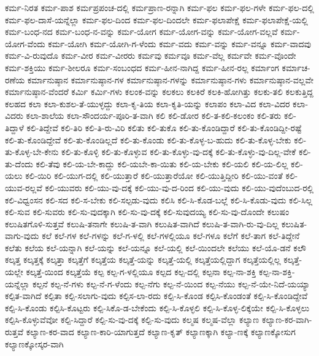 ಕರ್ಮ-ನಿರತ
ಕರ್ಮ-ಪಾಶ
ಕರ್ಮಪ್ರಪಂಚ-ದಲ್ಲಿ
ಕರ್ಮಪ್ರಾಣ-ರನ್ನಾಗಿ
ಕರ್ಮ-ಫಲ
ಕರ್ಮ-ಫಲ-ಗಳೇ
ಕರ್ಮ-ಫಲ-ದಲ್ಲಿ
ಕರ್ಮ-ಫಲ-ದಾಸೆ-ಯನ್ನೆಲ್ಲಾ
ಕರ್ಮ-ಫಲ-ದಿಂದ
ಕರ್ಮ-ಫಲ-ದಿಂದಲೇ
ಕರ್ಮ-ಫಲಾಪೇಕ್ಷೆ
ಕರ್ಮ-ಫಲಾಪೇಕ್ಷೆ-ಯಲ್ಲಿ
ಕರ್ಮ-ಬಂಧ-ನದ
ಕರ್ಮ-ಬಂಧ-ನ-ವನ್ನು
ಕರ್ಮ-ಯೋಗ
ಕರ್ಮ-ಯೋಗ-ವನ್ನು
ಕರ್ಮ-ಯೋಗ-ವಲ್ಲವೆ
ಕರ್ಮ-ಯೋಗ-ವೆಂದು
ಕರ್ಮ-ಯೋಗಿ
ಕರ್ಮ-ಯೋಗಿ-ಗ-ಳೆಂದು
ಕರ್ಮ-ವದು
ಕರ್ಮ-ವನ್ನು
ಕರ್ಮ-ವನ್ನೂ
ಕರ್ಮ-ವಾದವು
ಕರ್ಮ-ವಿ-ರುವುದೊ
ಕರ್ಮ-ವೀರ
ಕರ್ಮ-ವೀರರು
ಕರ್ಮವು
ಕರ್ಮವೂ
ಕರ್ಮ-ವೆಲ್ಲ
ಕರ್ಮವೇ
ಕರ್ಮ-ವೊಂದೇ
ಕರ್ಮ-ಶಕ್ತಿಯು
ಕರ್ಮ-ಶೀಲರೂ
ಕರ್ಮ-ಸಂಬಂಧದ
ಕರ್ಮ-ಹೀನ-ನಾಗಿದ್ದ
ಕರ್ಮ-ಹೀನ-ರಲ್ಲ
ಕರ್ಮಾಂಗ
ಕರ್ಮಾಚ-ರಣೆಯ
ಕರ್ಮಾನುಷ್ಠಾನ
ಕರ್ಮಾನುಷ್ಠಾನ-ಗಳ
ಕರ್ಮಾನುಷ್ಠಾನ-ಗಳನ್ನು
ಕರ್ಮಾನುಷ್ಠಾನ-ಗಳು
ಕರ್ಮಾನುಷ್ಠಾನ-ವಲ್ಲವೇ
ಕರ್ಮಾನುಷ್ಠಾನ-ವೆಂದರೆ
ಕರ್ಮಿ
ಕರ್ಮಿ-ಗಳು
ಕಲಂಕ-ವನ್ನು
ಕಲಕಲು
ಕಲಕಿರೆ
ಕಲಕಿ-ಹೋಗಿತ್ತು
ಕಲಕು-ತಲಿ
ಕಲಕುತ್ತಿದ್ದ
ಕಲಹದ
ಕಲಾ
ಕಲಾ-ಕುಶಲ-ತೆ-ಯುಳ್ಳದ್ದು
ಕಲಾ-ಕೃ-ತಿಯ
ಕಲಾ-ಕೃತಿ-ಯನ್ನು
ಕಲಾಪಂ
ಕಲಾ-ವಿದ
ಕಲಾ-ವಿದರ
ಕಲಾ-ವಿದರು
ಕಲಾ-ಶಾಲೆಯ
ಕಲಾ-ಸೌಂದರ್ಯ-ಪೂರಿ-ತ-ವಾಗಿ
ಕಲಿ
ಕಲಿ-ಡೋರ
ಕಲಿ-ತ-ಕಲಿ-ಕಲಂಕಂ
ಕಲಿ-ತರು
ಕಲಿ-ತಿದ್ದಾಳೆ
ಕಲಿ-ತಿದ್ದೇವೆ
ಕಲಿ-ತಿರಿ
ಕಲಿ-ತಿ-ರು-ವಿರಿ
ಕಲಿತು
ಕಲಿ-ತುಕೊ
ಕಲಿ-ತು-ಕೊಂಡಿದ್ದಾರೆ
ಕಲಿ-ತು-ಕೊಂಡಿದ್ದೀ-ರಷ್ಟೆ
ಕಲಿ-ತು-ಕೊಂಡಿದ್ದೇವೆ
ಕಲಿ-ತು-ಕೊಂಡಿಲ್ಲದೆ
ಕಲಿ-ತು-ಕೊಂಡು
ಕಲಿ-ತು-ಕೊಳ್ಳ-ಬ-ಹುದು
ಕಲಿ-ತು-ಕೊಳ್ಳ-ಬೇಕು
ಕಲಿ-ತು-ಕೊಳ್ಳ-ಬೇ-ಕೇನು
ಕಲಿ-ತು-ಕೊಳ್ಳಿ
ಕಲಿ-ತು-ಕೊಳ್ಳುವ
ಕಲಿ-ತು-ಕೊಳ್ಳು-ವು-ದಕ್ಕೆ
ಕಲಿ-ತು-ಕೊಳ್ಳು-ವು-ದಿಲ್ಲ-ವೇಕೆ
ಕಲಿ-ತು-ದೆಂದು
ಕಲಿ-ತೆವು
ಕಲಿ-ಯ-ಬೇ-ಕಾದ್ದು
ಕಲಿ-ಯಬೇ-ಕಾ-ಯಿತು
ಕಲಿ-ಯ-ಬೇಕು
ಕಲಿ-ಯಲಿ
ಕಲಿ-ಯ-ಲಿಲ್ಲ
ಕಲಿ-ಯಲು
ಕಲಿ-ಯಿರಿ
ಕಲಿ-ಯುಗ-ದಲ್ಲಿ
ಕಲಿ-ಯುತ್ತಾರೆ
ಕಲಿ-ಯುತ್ತಾರೆಯೋ
ಕಲಿ-ಯುತ್ತಿದ್ದೀರಿ
ಕಲಿ-ಯು-ವಂತೆ
ಕಲಿ-ಯುವ-ರಲ್ಲವೆ
ಕಲಿ-ಯುವರು
ಕಲಿ-ಯು-ವು-ದಕ್ಕೆ
ಕಲಿ-ಯು-ವು-ದ-ರಿಂದ
ಕಲಿ-ಯು-ವುದು
ಕಲಿ-ಯು-ವುದೆಂಬುದ-ರಲ್ಲಿ
ಕಲಿ-ವಿಧ್ವಂಸನ
ಕಲಿ-ಸದ
ಕಲಿ-ಸ-ಬೇಕು
ಕಲಿ-ಸಲ್ಪಡು-ವುದು
ಕಲಿಸಿ
ಕಲಿ-ಸಿ-ಕೊಡ-ಬಲ್ಲೆ
ಕಲಿ-ಸಿ-ಕೊಡು-ವುದು
ಕಲಿ-ಸಿಲ್ಲ
ಕಲಿ-ಸುವ
ಕಲಿ-ಸುವರು
ಕಲಿ-ಸು-ವುದಕ್ಕಾಗಿ
ಕಲಿ-ಸು-ವು-ದಕ್ಕೆ
ಕಲಿ-ಸುವುದಯ್ಯ
ಕಲಿ-ಸು-ವು-ದೊಂದೇ
ಕಲುಷಂ
ಕಲುಷಿತಗೊಳಿ-ಸುತ್ತವೆ
ಕಲುಷಿ-ತನಾಗೇ
ಕಲುಷಿ-ತ-ವಾಗಿ
ಕಲುಷಿತ-ವಾಗಿದೆ
ಕಲುಷಿ-ತ-ವಾಗಿ-ರು-ವು-ದಿಲ್ಲ
ಕಲುಷಿತ-ವಾಗು-ವುದು
ಕಲೆ
ಕಲೆ-ಗಳ
ಕಲೆ-ಗಳನ್ನು
ಕಲೆ-ಗ-ಳಲ್ಲಿ
ಕಲೆ-ಗಳಲ್ಲಿಯೂ
ಕಲೆ-ಗಳೂ
ಕಲೆಗೆ
ಕಲೆ-ತಾಗ
ಕಲೆ-ತಿದ್ದೇನೆ
ಕಲೆತು
ಕಲೆಯ
ಕಲೆ-ಯನ್ನಾಗಿ
ಕಲೆ-ಯನ್ನು
ಕಲೆ-ಯನ್ನೂ
ಕಲೆ-ಯಲ್ಲಿ
ಕಲೆ-ಯಿಂದಲೇ
ಕಲೆಯು
ಕಲೆ-ಯೊ-ಡನೆ
ಕಲೌ
ಕಲ್ಕತ್ತ
ಕಲ್ಕತ್ತಕ್ಕೆ
ಕಲ್ಕತ್ತಾ
ಕಲ್ಕತ್ತೆಗೆ
ಕಲ್ಕತ್ತೆಯ
ಕಲ್ಕತ್ತೆ-ಯನ್ನು
ಕಲ್ಕತ್ತೆ-ಯಲ್ಲಿ
ಕಲ್ಕತ್ತೆಯಲ್ಲಿದ್ದಾಗ
ಕಲ್ಕತ್ತೆಯಲ್ಲಿಲ್ಲ
ಕಲ್ಕತ್ತೆ-ಯಲ್ಲೇ
ಕಲ್ಕತ್ತೆ-ಯಿಂದ
ಕಲ್ಕತ್ತೆಯೆ
ಕಲ್ಪ
ಕಲ್ಪ-ಗ-ಳಲ್ಲಿಯೂ
ಕಲ್ಪದ
ಕಲ್ಪ-ದಲ್ಲಿ
ಕಲ್ಪನಾ
ಕಲ್ಪ-ನಾ-ಶಕ್ತಿ
ಕಲ್ಪ-ನಾ-ಶಕ್ತಿ-ಯನ್ನೆಲ್ಲಾ
ಕಲ್ಪನೆ
ಕಲ್ಪ-ನೆ-ಗಳು
ಕಲ್ಪ-ನೆ-ಗ-ಳೆಂದು
ಕಲ್ಪ-ನೆಗು
ಕಲ್ಪ-ನೆ-ಯಿಂದ
ಕಲ್ಪ-ನೆಯು
ಕಲ್ಪ-ನೆ-ಯೇ-ನಿದೆ-ಯಯ್ಯಾ
ಕಲ್ಪಿತ-ವಾಗಿದೆ
ಕಲ್ಪಿತಾ
ಕಲ್ಪಿ-ಸಲಾಗು-ವುದು
ಕಲ್ಪಿಸ-ಲಾ-ರದು
ಕಲ್ಪಿ-ಸಿ-ಕೊಂಡ
ಕಲ್ಪಿಸಿ-ಕೊಂಡಂತೆ
ಕಲ್ಪಿ-ಸಿ-ಕೊಂಡಿದ್ದೇವೆ
ಕಲ್ಪಿ-ಸಿ-ಕೊಂಡು
ಕಲ್ಪಿಸಿ-ಕೊಟ್ಟರು
ಕಲ್ಪಿ-ಸಿಕೊ-ಡ-ಬೇಕೆಂದು
ಕಲ್ಪಿ-ಸಿ-ಕೊಳ್ಳಲಿ
ಕಲ್ಪಿ-ಸಿ-ಕೊಳ್ಳ-ಲಿಕ್ಕೆಯೇ
ಕಲ್ಪಿ-ಸಿ-ಕೊಳ್ಳಲು
ಕಲ್ಪಿಸಿ-ಕೊಳ್ಳುವೆವೋ
ಕಲ್ಪಿ-ಸಿದ್ದಾರೆ
ಕಲ್ಪಿ-ಸು-ವು-ದಕ್ಕೆ
ಕಲ್ಪಿ-ಸು-ವುದು
ಕಲ್ಮಷ
ಕಲ್ಮಷ-ವೆಲ್ಲಾ
ಕಲ್ಯಾಣ
ಕಲ್ಯಾಣ-ಕರ-ವಾಗಿ-ರುತ್ತವೆ
ಕಲ್ಯಾಣ-ಕರ-ವಾದ
ಕಲ್ಯಾಣ-ಕಾರಿ-ಯಾಗುತ್ತದೆ
ಕಲ್ಯಾಣ-ಕೃತ್
ಕಲ್ಯಾಣಕ್ಕಾಗಿ
ಕಲ್ಯಾ-ಣಕ್ಕೆ
ಕಲ್ಯಾಣಕ್ಕೋಸುಗ
ಕಲ್ಯಾಣಕ್ಕೋಸ್ಕರ-ವಾಗಿ

